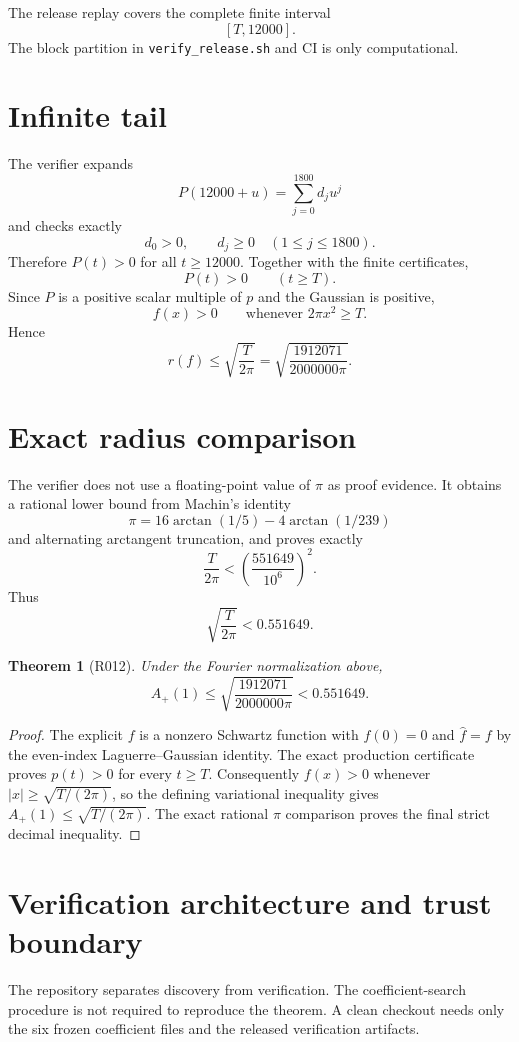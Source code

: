 \documentclass[11pt]{article}
\newtheorem{theorem}{Theorem}
\begin{document}
The release replay covers the complete finite interval
\[
[T,12000].
\]
The block partition in \texttt{verify\_release.sh} and CI is only computational.

\section{Infinite tail}
The verifier expands
\[
P(12000+u)=\sum_{j=0}^{1800}d_j u^j
\]
and checks exactly
\[
d_0>0,\qquad d_j\geq0\quad(1\leq j\leq1800).
\]
Therefore $P(t)>0$ for all $t\geq12000$.
Together with the finite certificates,
\[
P(t)>0\qquad(t\geq T).
\]
Since $P$ is a positive scalar multiple of $p$ and the Gaussian is positive,
\[
f(x)>0\qquad\text{whenever }2\pi x^2\geq T.
\]
Hence
\[
r(f)\leq\sqrt{\frac{T}{2\pi}}
=\sqrt{\frac{1912071}{2000000\pi}}.
\]

\section{Exact radius comparison}
The verifier does not use a floating-point value of $\pi$ as proof evidence.
It obtains a rational lower bound from Machin's identity
\[
\pi=16\arctan(1/5)-4\arctan(1/239)
\]
and alternating arctangent truncation, and proves exactly
\[
\frac{T}{2\pi}<\left(\frac{551649}{10^6}\right)^2.
\]
Thus
\[
\sqrt{\frac{T}{2\pi}}<0.551649.
\]

\begin{theorem}[R012]
Under the Fourier normalization above,
\[
A_+(1)\leq\sqrt{\frac{1912071}{2000000\pi}}<0.551649.
\]
\end{theorem}

\begin{proof}
The explicit $f$ is a nonzero Schwartz function with $f(0)=0$ and $\widehat f=f$ by the even-index Laguerre--Gaussian identity.
The exact production certificate proves $p(t)>0$ for every $t\geq T$.
Consequently $f(x)>0$ whenever $|x|\geq\sqrt{T/(2\pi)}$, so the defining variational inequality gives $A_+(1)\leq\sqrt{T/(2\pi)}$.
The exact rational $\pi$ comparison proves the final strict decimal inequality.
\end{proof}

\section{Verification architecture and trust boundary}
The repository separates discovery from verification.
The coefficient-search procedure is not required to reproduce the theorem.
A clean checkout needs only the six frozen coefficient files and the released verification artifacts.
\end{document}
